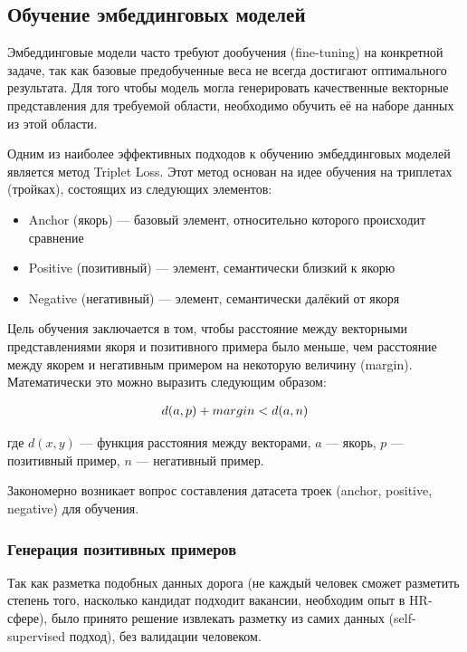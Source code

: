 \documentclass[14pt]{mmcs_article}
\begin{document}
\subsection*{Обучение эмбеддинговых моделей}

Эмбеддинговые модели часто требуют дообучения (fine-tuning) на конкретной задаче, так как базовые предобученные веса не всегда достигают оптимального результата. Для того чтобы модель могла генерировать качественные векторные представления для требуемой области, необходимо обучить её на наборе данных из этой области.

Одним из наиболее эффективных подходов к обучению эмбеддинговых моделей является метод Triplet Loss. Этот метод основан на идее обучения на триплетах (тройках), состоящих из следующих элементов:
\begin{itemize}
  \item Anchor (якорь) --- базовый элемент, относительно которого происходит сравнение
  \item Positive (позитивный) --- элемент, семантически близкий к якорю
  \item Negative (негативный) --- элемент, семантически далёкий от якоря
\end{itemize}

Цель обучения заключается в том, чтобы расстояние между векторными представлениями якоря и позитивного примера было меньше, чем расстояние между якорем и негативным примером на некоторую величину (margin). Математически это можно выразить следующим образом:

\begin{equation*}
  \centering
  \allowdisplaybreaks[1]
  \begin{split}
    d(a,p) + margin < d(a,n)
  \end{split}
\end{equation*}

где $d(x,y)$ --- функция расстояния между векторами, $a$ --- якорь, $p$ --- позитивный пример, $n$ --- негативный пример.

Закономерно возникает вопрос составления датасета троек (anchor, positive, negative) для обучения.

\subsubsection{Генерация позитивных примеров}\label{positive_examples_generation}

Так как разметка подобных данных дорога (не каждый человек сможет разметить степень того, насколько кандидат подходит вакансии, необходим опыт в HR-сфере), было принято решение извлекать разметку из самих данных (self-supervised подход), без валидации человеком.
\end{document}
